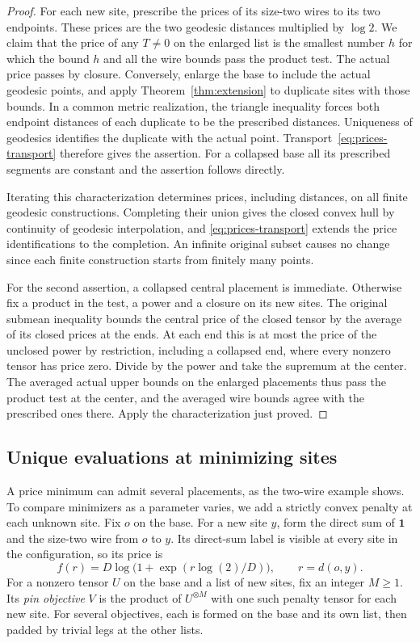 \begin{proof}
For each new site, prescribe the prices of its size-two wires to its
two endpoints. These prices are the two geodesic distances multiplied
by \(\log 2\). We claim that the price of any \(T\ne0\) on the enlarged
list is the smallest number \(h\) for which the bound \(h\) and all the
wire bounds pass the product test. The actual price passes by closure.
Conversely, enlarge the base to include the actual geodesic points,
and apply Theorem~\ref{thm:extension} to duplicate sites with those
bounds. In a common metric realization, the triangle inequality forces
both endpoint distances of each duplicate to be the prescribed distances.
Uniqueness of geodesics identifies the duplicate with the actual point.
Transport~\eqref{eq:prices-transport}
therefore gives the assertion. For a collapsed base all its prescribed
segments are constant and the assertion follows directly.

Iterating this characterization determines prices, including distances,
on all finite geodesic constructions. Completing their union gives the
closed convex hull by continuity of geodesic interpolation, and
\eqref{eq:prices-transport} extends the price identifications to the
completion. An infinite original subset causes no change since each
finite construction starts from finitely many points.

For the second assertion, a collapsed central placement is immediate.
Otherwise fix a product in the test, a power and a closure on its new
sites. The original submean inequality bounds the central price of the
closed tensor by the average of its closed prices at the ends. At each
end this is at most the price of the unclosed power by restriction,
including a collapsed end, where every nonzero tensor has price zero.
Divide by the power and take the supremum at the center. The averaged
actual upper bounds on the enlarged placements thus pass the product
test at the center, and the averaged wire bounds agree with the
prescribed ones there. Apply the characterization just proved.
\end{proof}

\subsection{Unique evaluations at minimizing sites}
A price minimum can admit several placements, as the two-wire example
shows. To compare minimizers as a parameter varies, we add a strictly
convex penalty at each unknown site. Fix \(o\) on the base. For a new
site \(y\), form the direct sum of \(\mathbf1\) and the size-two wire
from \(o\) to \(y\). Its direct-sum label is visible at every site in
the configuration, so its price is
\[
 f(r)=D\log\bigl(1+\exp(r\log(2)/D)\bigr),\qquad r=d(o,y).
\]
For a nonzero tensor \(U\) on the base and a list of new sites, fix an
integer \(M\ge1\). Its \emph{pin objective} \(V\) is the product of
\(U^{\otimes M}\) with one such penalty tensor for each new site.
For several objectives, each is formed on the base and its own list,
then padded by trivial legs at the other lists.

